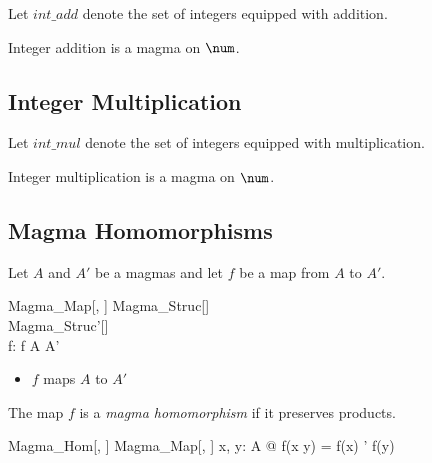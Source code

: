 \documentclass{amsart}
\begin{document}
Let $int\_add$ denote the set of integers equipped with addition.

\begin{example}
Integer addition is a magma on $\num$.
\end{example}

\subsection{Integer Multiplication}

Let $int\_mul$ denote the set of integers equipped with multiplication.

\begin{example}
Integer multiplication is a magma on $\num$.
\end{example}

\subsection{Magma Homomorphisms}

Let $A$ and $A'$ be a magmas and let $f$ be a map from $A$ to $A'$.

\begin{schema}{Magma\_Map}[\genT, \genU]
	Magma\_Struc[\genT] \\
	Magma\_Struc'[\genU] \\
	f: \genT \pfun \genU
\where
	f \in A \fun A'
\end{schema}

\begin{itemize}
	\item $f$ maps $A$ to $A'$
\end{itemize}

The map $f$ is a \textit{magma homomorphism} if it preserves products.

\begin{schema}{Magma\_Hom}[\genT, \genU]
	Magma\_Map[\genT, \genU]
\where
	\forall x, y: A @ f(x \opG y) = f(x) \opG' f(y)
\end{schema}
\end{document}
